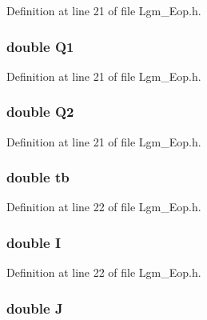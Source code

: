 Definition at line 21 of file Lgm\_\-Eop.h.\hypertarget{struct_lgm___nga_eopp_ec6b688f140cf83474744af7c64ea797}{
\subsubsection[{Q1}]{\setlength{\rightskip}{0pt plus 5cm}double {\bf Q1}}}
\label{struct_lgm___nga_eopp_ec6b688f140cf83474744af7c64ea797}




Definition at line 21 of file Lgm\_\-Eop.h.\hypertarget{struct_lgm___nga_eopp_0bb5cae858fc5029a6d950063227934f}{
\subsubsection[{Q2}]{\setlength{\rightskip}{0pt plus 5cm}double {\bf Q2}}}
\label{struct_lgm___nga_eopp_0bb5cae858fc5029a6d950063227934f}




Definition at line 21 of file Lgm\_\-Eop.h.\hypertarget{struct_lgm___nga_eopp_4bc6ff5e2b9663d2ceb6619b60b3908e}{
\subsubsection[{tb}]{\setlength{\rightskip}{0pt plus 5cm}double {\bf tb}}}
\label{struct_lgm___nga_eopp_4bc6ff5e2b9663d2ceb6619b60b3908e}




Definition at line 22 of file Lgm\_\-Eop.h.\hypertarget{struct_lgm___nga_eopp_07eb382f5743a852ab6f175e5db993f9}{
\subsubsection[{I}]{\setlength{\rightskip}{0pt plus 5cm}double {\bf I}}}
\label{struct_lgm___nga_eopp_07eb382f5743a852ab6f175e5db993f9}




Definition at line 22 of file Lgm\_\-Eop.h.\hypertarget{struct_lgm___nga_eopp_229fe836529a54bc8a7d390148d7a488}{
\subsubsection[{J}]{\setlength{\rightskip}{0pt plus 5cm}double {\bf J}}}
\label{struct_lgm___nga_eopp_229fe836529a54bc8a7d390148d7a488}





